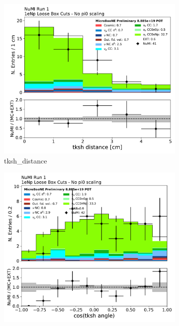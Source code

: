 \begin{figure}[H]
    \centering
    \begin{subfigure}{0.3\textwidth}
    \includegraphics[width=1.0\textwidth]{Sidebands/Figures/NuMI/1eNp/tksh_distance.pdf}
    \caption{tksh\_distance}
    \end{subfigure}
    \begin{subfigure}{0.3\textwidth}
    \includegraphics[width=1.0\textwidth]{Sidebands/Figures/NuMI/1eNp/tksh_angle.pdf}

\end{subfigure}
\end{figure}
